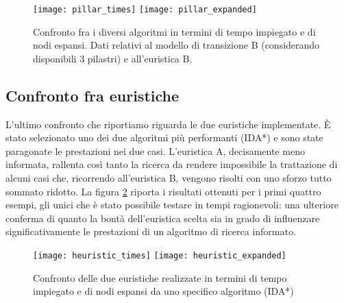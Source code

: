 \begin{figure}[h]
\centering
\texttt{[image: pillar\_times]}
\vskip 20pt
\texttt{[image: pillar\_expanded]}
\caption{Confronto fra i diversi algoritmi in termini di tempo impiegato e di nodi espansi. Dati relativi al modello di transizione B (considerando disponibili 3 pilastri) e all'euristica B. }
\label{pillar_compare}
\end{figure}

\subsection{Confronto fra euristiche}

L'ultimo confronto che riportiamo riguarda le due euristiche implementate. È stato selezionato uno dei due algoritmi più performanti (IDA*) e sono state paragonate le prestazioni nei due casi. L'euristica A, decisamente meno informata, rallenta così tanto la ricerca da rendere impossibile la trattazione di alcuni casi che, ricorrendo all'euristica B, vengono risolti con uno sforzo tutto sommato ridotto. La figura \ref{heuristic_compare} riporta i risultati ottenuti per i primi quattro esempi, gli unici che è stato possibile testare in tempi ragionevoli: una ulteriore conferma di quanto la bontà dell'euristica scelta sia in grado di influenzare significativamente le prestazioni di un algoritmo di ricerca informato. 

\begin{figure}[h]
\centering
\texttt{[image: heuristic\_times]}
\vskip 20pt
\texttt{[image: heuristic\_expanded]}
\caption{Confronto delle due euristiche realizzate in termini di tempo impiegato e di nodi espansi da uno specifico algoritmo (IDA*)}
\label{heuristic_compare}
\end{figure}

